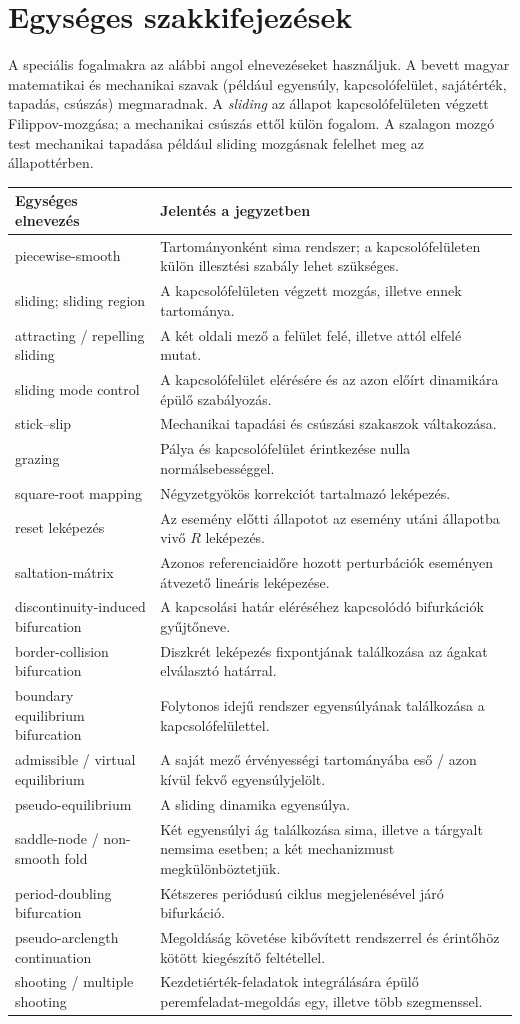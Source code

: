 \section*{Egységes szakkifejezések}
A speciális fogalmakra az alábbi angol elnevezéseket használjuk. A bevett magyar matematikai és mechanikai szavak (például egyensúly, kapcsolófelület, sajátérték, tapadás, csúszás) megmaradnak. A \emph{sliding} az állapot kapcsolófelületen végzett Filippov-mozgása; a mechanikai csúszás ettől külön fogalom. A szalagon mozgó test mechanikai tapadása például sliding mozgásnak felelhet meg az állapottérben.
\begin{longtable}{@{}p{}p{}@{}}
\toprule Egységes elnevezés & Jelentés a jegyzetben\\\midrule\endhead
piecewise-smooth & Tartományonként sima rendszer; a kapcsolófelületen külön illesztési szabály lehet szükséges.\\
sliding; sliding region & A kapcsolófelületen végzett mozgás, illetve ennek tartománya.\\
attracting / repelling sliding & A két oldali mező a felület felé, illetve attól elfelé mutat.\\
sliding mode control & A kapcsolófelület elérésére és az azon előírt dinamikára épülő szabályozás.\\
stick--slip & Mechanikai tapadási és csúszási szakaszok váltakozása.\\
grazing & Pálya és kapcsolófelület érintkezése nulla normálsebességgel.\\
square-root mapping & Négyzetgyökös korrekciót tartalmazó leképezés.\\
reset leképezés & Az esemény előtti állapotot az esemény utáni állapotba vivő $R$ leképezés.\\
saltation-mátrix & Azonos referenciaidőre hozott perturbációk eseményen átvezető lineáris leképezése.\\
discontinuity-induced bifurcation & A kapcsolási határ eléréséhez kapcsolódó bifurkációk gyűjtőneve.\\
border-collision bifurcation & Diszkrét leképezés fixpontjának találkozása az ágakat elválasztó határral.\\
boundary equilibrium bifurcation & Folytonos idejű rendszer egyensúlyának találkozása a kapcsolófelülettel.\\
admissible / virtual equilibrium & A saját mező érvényességi tartományába eső / azon kívül fekvő egyensúlyjelölt.\\
pseudo-equilibrium & A sliding dinamika egyensúlya.\\
saddle-node / non-smooth fold & Két egyensúlyi ág találkozása sima, illetve a tárgyalt nemsima esetben; a két mechanizmust megkülönböztetjük.\\
period-doubling bifurcation & Kétszeres periódusú ciklus megjelenésével járó bifurkáció.\\
pseudo-arclength continuation & Megoldáság követése kibővített rendszerrel és érintőhöz kötött kiegészítő feltétellel.\\
shooting / multiple shooting & Kezdetiérték-feladatok integrálására épülő peremfeladat-megoldás egy, illetve több szegmenssel.\\
\bottomrule
\end{longtable}
